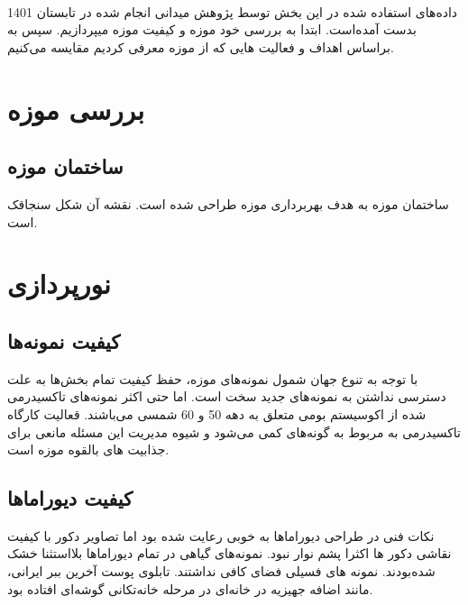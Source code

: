 

\paragraph*{}
داده‌های استفاده شده در این بخش توسط پژوهش میدانی انجام شده در تابستان 1401 بدست آمده‌است.
ابتدا به بررسی خود موزه و کیفیت موزه میپردازیم.
سپس به براساس اهداف و فعالیت هایی که از موزه معرفی کردیم مقایسه می‌کنیم.

\section*{بررسی موزه}

\subsection*{ساختمان موزه}
ساختمان موزه به هدف بهربرداری موزه طراحی شده است. نقشه آن شکل سنجاقک است.

\section*{نورپردازی}


\subsection*{کیفیت نمونه‌ها}

با توجه به تنوع جهان شمول نمونه‌های موزه، حفظ کیفیت تمام بخش‌ها به علت دسترسی نداشتن به نمونه‌های جدید سخت است. اما حتی اکثر نمونه‌های تاکسیدرمی شده از اکوسیستم بومی  متعلق به دهه 50 و 60 شمسی می‌باشند. قعالیت کارگاه تاکسیدرمی به مربوط به گونه‌های کمی ‌می‌شود و شیوه مدیریت این مسئله مانعی برای جذابیت های بالقوه موزه است.

\subsection*{کیفیت دیوراماها}

نکات فنی در طراحی دیوراماها به خوبی رعایت شده بود اما تصاویر دکور با کیفیت نقاشی دکور ها اکثرا پشم نوار نبود.
نمونه‌های گیاهی در تمام دیوراماها بلااستثنا خشک شده‌بودند.
نمونه های فسیلی فضای کافی نداشتند.
تابلوی پوست آخرین ببر ایرانی، مانند اضافه جهیزیه در خانه‌ای در مرحله خانه‌تکانی گوشه‌ای افتاده بود.